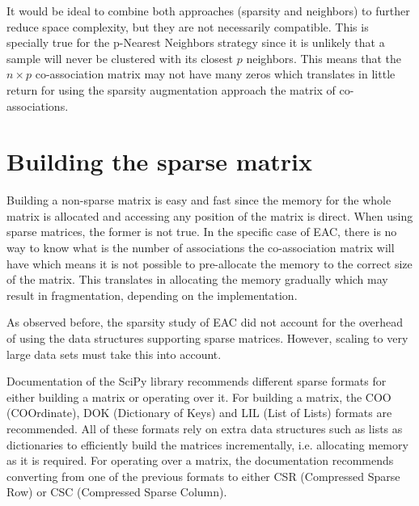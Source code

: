 It would be ideal to combine both approaches (sparsity and neighbors) to further reduce space complexity, but they are not necessarily compatible.
This is specially true for the p-Nearest Neighbors strategy since it is unlikely that a sample will never be clustered with its closest $p$ neighbors.
This means that the $n \times p$ co-association matrix may not have many zeros which translates in little return for using the sparsity augmentation approach the matrix of co-associations.

\section{Building the sparse matrix}
\label{sec:sparse coassoc}

Building a non-sparse matrix is easy and fast since the memory for the whole matrix is allocated and accessing any position of the matrix is direct.
When using sparse matrices, the former is not true.
In the specific case of EAC, there is no way to know what is the number of associations the co-association matrix will have which means it is not possible to pre-allocate the memory to the correct size of the matrix.
This translates in allocating the memory gradually which may result in fragmentation, depending on the implementation. 

As observed before, the sparsity study of EAC \cite{Lourenco2010} did not account for the overhead of using the data structures supporting sparse matrices.
However, scaling to very large data sets must take this into account.

Documentation of the SciPy library recommends different sparse formats for either building a matrix or operating over it.
For building a matrix, the COO (COOrdinate), DOK (Dictionary of Keys) and LIL (List of Lists) formats are recommended.
All of these formats rely on extra data structures such as lists as dictionaries to efficiently build the matrices incrementally, i.e. allocating memory as it is required.
For operating over a matrix, the documentation recommends converting from one of the previous formats to either CSR (Compressed Sparse Row) or CSC (Compressed Sparse Column).

